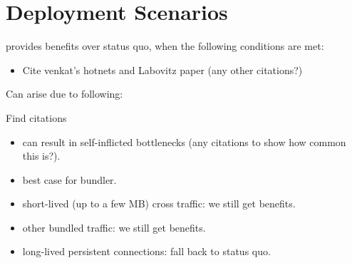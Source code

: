 \section{Deployment Scenarios}
\label{s:deploy}


\name provides benefits over status quo, when the following conditions are met:

\begin{itemize}
    \item Cite venkat's hotnets and Labovitz paper (any other citations?)
\end{itemize}

Can arise due to following:

Find citations
\begin{itemize}
    \item can result in self-inflicted bottlenecks (any citations to show how common this is?).
    \item best case for bundler.
\end{itemize}

\begin{itemize}
    \item short-lived (up to a few MB) cross traffic: we still get benefits.
    \item other bundled traffic: we still get benefits.
    \item long-lived persistent connections: fall back to status quo.
\end{itemize}

\radhika{*/}
